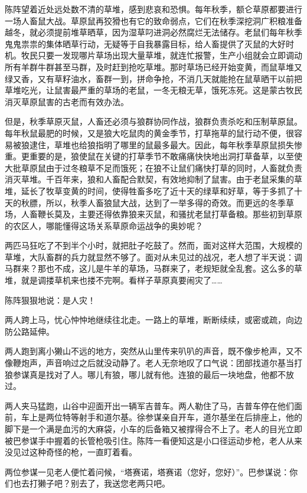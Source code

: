\par 陈阵望着近处远处数不清的草堆，感到悲哀和恐惧。每年秋季，额仑草原都要进行一场人畜鼠大战。草原鼠再狡猾也有它的致命弱点，它们在秋季深挖洞广积粮准备越冬，就必须提前堆草晒草，因为湿草叼进洞必然腐烂无法储存。老鼠们每年秋季鬼鬼祟祟的集体晒草行动，无疑等于自我暴露目标，给人畜提供了灭鼠的大好时机。牧民只要一发现哪片草场出现大量草堆，就连忙报警，生产小组就会立即调动所有羊群牛群甚至马群，及时赶到抢吃草堆。那时草场已经开始变黄，而鼠草堆又绿又香，又有草籽油水，畜群一到，拼命争抢，不消几天就能抢在鼠草晒干以前把草堆吃光，让鼠害最严重的草场的老鼠，一冬无粮无草，饿死冻死。这是蒙古牧民消灭草原鼠害的古老而有效办法。
\par 但是，秋季草原灭鼠，人畜还必须与狼群协同作战，狼群负责杀吃和压制草原鼠。每年秋鼠最肥的时候，又是狼大吃鼠肉的黄金季节，打草拖草的鼠行动不便，很容易被狼逮住，草堆也给狼指明了哪里的鼠最多最大。因此，每年秋季草原鼠损失惨重。更重要的是，狼使鼠在关键的打草季节不敢痛痛快快地出洞打草备草，以至使大批草原鼠由于过冬粮草不足而饿死；在狼不让鼠们痛快打草的同时，人畜就负责消灭草堆。千百年来，狼和人畜配合默契，有效地抑制了鼠害。由于老鼠采集的草堆，延长了牧草变黄的时间，使得牲畜多吃了近十天的绿草和好草，等于多抓了十天的秋膘，所以，秋季人畜狼鼠大战，达到了一举多得的奇效。而更远的冬季草场，人畜鞭长莫及，主要还得依靠狼来灭鼠，和骚扰老鼠打草备粮。那些初到草原的农区人，哪能懂得这场关系草原命运战争的奥妙呢？
\par 两匹马狂吃了不到半个小时，就把肚子吃鼓了。然而，面对这样大范围，大规模的草堆，大队畜群的兵力就显然不够了。面对从未见过的战况，老人想了半天说：调马群来？那也不成，这儿是牛羊的草场，马群来了，老规矩就全乱套。这么多的草堆，就是调搂草机来也搂不完啊。看样子草原真要闹灾了……
\par 陈阵狠狠地说：是人灾！
\par 两人跨上马，忧心忡忡地继续往北走。一路上的草堆，断断续续，或密或疏，向边防公路延伸。
\par 
\par 两人跑到离小獭山不远的地方，突然从山里传来叭叭的声音，既不像步枪声，又不像鞭炮声，声音响过之后就没动静了。老人无奈地叹了口气说：团部找道尔基当打狼参谋真是找对了人。哪儿有狼，哪儿就有他。连狼的最后一块地盘，他都不放过。
\par 两人夹马猛跑，山谷中迎面开出一辆军吉普车。两人勒住了马，吉普车停在他们面前，车上是两位特等射手和道尔基。徐参谋亲自开车，道尔基坐在后排座上，他的脚下是一个满是血污的大麻袋，小车的后备箱又被撑得合不上了。老人的目光立即被巴参谋手中握着的长管枪吸引住。陈阵一看便知这是小口径运动步枪，老人从来没见过这种奇怪的枪，一直盯着看。
\par 两位参谋一见老人便忙着问候，“塔赛诺，塔赛诺（您好，您好）”。巴参谋说：你们也去打獭子吧？别去了，我送您老两只吧。

